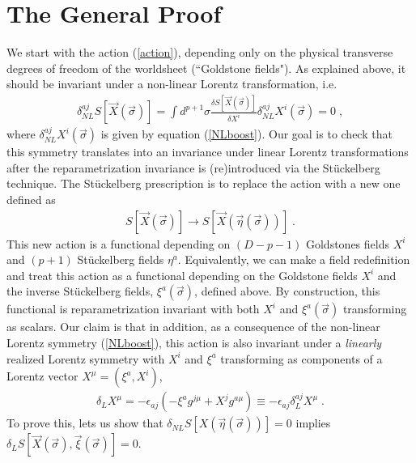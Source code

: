 \documentclass[%
 reprint,
 amsmath,amssymb,
 aps,
]{revtex4-1}
\begin{document}
\section{The General Proof}

We start with  the action (\ref{action}), depending
only on the physical transverse degrees of freedom of the worldsheet (``Goldstone fields").
As explained above, it should be invariant under a non-linear Lorentz transformation, i.e.
\begin{eqnarray}
    \delta^{a j}_{NL} S \left[ \vec{X}(\vec{\sigma}) \right]
    =
    \int d^{p+1} \sigma  \frac{\delta S[ \vec{X}(\vec{\sigma}) ]}{\delta X^i}
    \delta^{a j}_{NL} X^i(\vec{\sigma}) \nonumber = 0 \; , \nonumber
\end{eqnarray}
where $\delta^{aj}_{NL} X^i(\vec{\sigma})$ is given by equation (\ref{NLboost}).
Our goal is to check that this symmetry translates into an invariance under linear Lorentz transformations after the
reparametrization invariance is (re)introduced via the St\"uckelberg technique.
The  St\"uckelberg prescription is to replace the action with a new
one defined as
\begin{eqnarray}
    S[\vec{X}(\vec{\sigma})] \rightarrow S[\vec{X}(\vec{\eta}(\vec{\sigma}))] \; . \nonumber
\end{eqnarray}
This new action is a functional depending on $(D-p-1)$ Goldstones fields $X^i$ and $(p+1)$ St\"uckelberg fields $\eta^a$.
Equivalently, we can make a field redefinition and treat  this action as a functional depending on  the Goldstone fields $X^i$ and
the inverse St\"uckelberg fields, $\xi^a(\vec{\sigma})$, defined above. By construction, this functional is reparametrization invariant with
both $X^i$ and $\xi^a(\vec{\sigma})$ transforming as scalars.
 Our claim is that in addition, as a consequence of the non-linear Lorentz symmetry (\ref{NLboost}), this action is also invariant under a {\it linearly} realized
 Lorentz symmetry with $X^i$ and $\xi^a$ transforming as components of a Lorentz vector $X^\mu=(\xi^a, X^i)$,
\begin{eqnarray}
\label{linearvar}
    \delta_{L} X^{\mu} = -\epsilon_{a j} (-\xi^a g^{j \mu} + X^j g^{a \mu} ) \equiv -\epsilon_{a j} \delta^{a j}_L X^{\mu} \; .
\end{eqnarray}
To prove this, lets us  show  that
$\delta_{NL} S[X(\vec{\eta}(\vec{\sigma}))] = 0$ implies $\delta_{L} S[\vec{X}(\vec{\sigma}),\vec{\xi}(\vec{\sigma})] = 0$.
\end{document}
